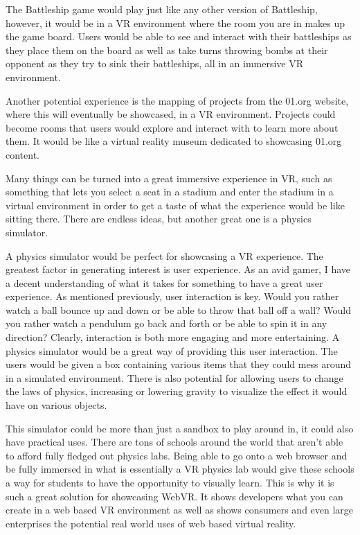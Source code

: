 \documentclass[draftclsnofoot,onecolumn,letterpaper,10pt]{article}
\begin{document}
The Battleship game would play just like any other version of Battleship, however, it would be in a VR environment where the room you are in makes up the game board. Users would be able to see and interact with their battleships as they place them on the board as well as take turns throwing bombs at their opponent as they try to sink their battleships, all in an immersive VR environment.

Another potential experience is the mapping of projects from the 01.org website, where this will eventually be showcased, in a VR environment. Projects could become rooms that users would explore and interact with to learn more about them. It would be like a virtual reality museum dedicated to showcasing 01.org content.

Many things can be turned into a great immersive experience in VR, such as something that lets you select a seat in a stadium and enter the stadium in a virtual environment in order to get a taste of what the experience would be like sitting there. There are endless ideas, but another great one is a physics simulator.

A physics simulator would be perfect for showcasing a VR experience. The greatest factor in generating interest is user experience. As an avid gamer, I have a decent understanding of what it takes for something to have a great user experience. As mentioned previously, user interaction is key. Would you rather watch a ball bounce up and down or be able to throw that ball off a wall? Would you rather watch a pendulum go back and forth or be able to spin it in any direction? Clearly, interaction is both more engaging and more entertaining. A physics simulator would be a great way of providing this user interaction. The users would be given a box containing various items that they could mess around in a simulated environment. There is also potential for allowing users to change the laws of physics, increasing or lowering gravity to visualize the effect it would have on various objects.

This simulator could be more than just a sandbox to play around in, it could also have practical uses. There are tons of schools around the world that aren't able to afford fully fledged out physics labs. Being able to go onto a web browser and be fully immersed in what is essentially a VR physics lab would give these schools a way for students to have the opportunity to visually learn. This is why it is such a great solution for showcasing WebVR. It shows developers what you can create in a web based VR environment as well as shows consumers and even large enterprises the potential real world uses of web based virtual reality.
\end{document}

